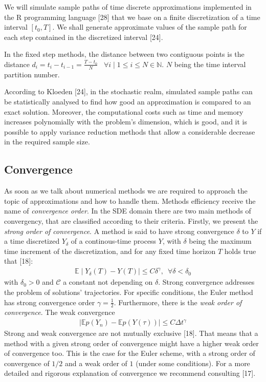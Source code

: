 \documentclass[12pt,twoside]{reedthesis}
\theoremstyle{definition}
\theoremstyle{definition}
\theoremstyle{remark}
\begin{document}
  We will simulate sample paths of time discrete approximations
  implemented in the R programming language {[}28{]} that we base on a
  finite discretization of a time interval \([t_0, T]\). We shall generate
  approximate values of the sample path for each step contained in the
  discretized interval {[}24{]}.
  
  In the fixed step methods, the distance between two contiguous points is
  the distance
  \(d_i = t_i - t_{i-1} = \frac{T-t_0}{N} \;\;\; \forall i \mid 1 \leq i \leq N \in \mathbb{N}\).
  \(N\) being the time interval partition number.
  
  According to Kloeden {[}24{]}, in the stochastic realm, simulated sample
  paths can be statistically analysed to find how good an approximation is
  compared to an exact solution. Moreover, the computational costs such as
  time and memory increases polynomially with the problem's dimension,
  which is good, and it is possible to apply variance reduction methods
  that allow a considerable decrease in the required sample size.
  
  \subsection{Convergence}\label{convergence}
  
  As soon as we talk about numerical methods we are required to approach
  the topic of approximations and how to handle them. Methods efficiency
  receive the name of \emph{convergence order}. In the SDE domain there
  are two main methods of convergency, that are classified according to
  their criteria. Firstly, we present the \emph{strong order of
  convergence}. A method is said to have strong convergence \(\delta\) to
  \(Y\) if a time discretized \(Y_{\delta}\) of a continous-time process
  \(Y\), with \(\delta\) being the maximum time increment of the
  discretization, and for any fixed time horizon \(T\) holds true that
  {[}18{]}:
  \begin{align*}
  \mathbb{E} \mid Y_{\delta}(T) - Y(T) \mid \leq C \delta^{\gamma}, \,\,\, \forall \delta < \delta_0
  \end{align*}
  with \(\delta_0 > 0\) and \(\mathcal{C}\) a constant not depending on
  \(\delta\). Strong convergence addresses the problem of solutions'
  trajectories. For specific conditions, the Euler method has strong
  convergence order \(\gamma = \frac{1}{2}\). Furthermore, there is the
  \emph{weak order of convergence}. The weak convergence
  \begin{align*}
  \mid  \mathbb{E}p(Y_n) - \mathbb{E}p(Y(\tau)) \mid \leq C \Delta t^{\gamma}
  \end{align*}
  Strong and weak convergence are not mutually exclusive {[}18{]}. That
  means that a method with a given strong order of convergence might have
  a higher weak order of convergence too. This is the case for the Euler
  scheme, with a strong order of convergence of \(1/2\) and a weak order
  of \(1\) (under some conditions). For a more detailed and rigorous
  explanation of convergence we recommend consulting {[}17{]}.
  
\end{document}
